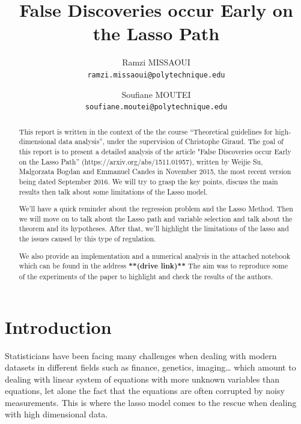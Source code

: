 \documentclass[10pt,onecolumn,letterpaper]{article}
\begin{document}
\title{False Discoveries occur Early on the Lasso Path}

\author{
   Ramzi MISSAOUI\\
{\tt\small ramzi.missaoui@polytechnique.edu}
\and
Soufiane MOUTEI\\
{\tt\small soufiane.moutei@polytechnique.edu}
}

\maketitle

\begin{abstract}
   This report is written in the context of the the course “Theoretical guidelines for high-dimensional data analysis”, under the supervision of Christophe Giraud.
The goal of this report is to present a detailed analysis of the article  "False Discoveries occur Early on the Lasso Path” (https://arxiv.org/abs/1511.01957),  written by Weijie Su, Malgorzata Bogdan and Emmanuel Candes in November 2015, the most recent version being dated September 2016. We will try to grasp the key points, discuss the main results then talk about some limitations of the Lasso model. 

We'll have a quick reminder about the regression problem and the Lasso Method. Then we will move on to talk about the Lasso path and variable selection and talk about the theorem and its hypotheses. After that, we’ll highlight the limitations of the lasso and the issues caused by this type of regulation.

We also provide an implementation and a numerical analysis in the attached notebook which can be found in the address \textbf{**(drive link)** }The aim was to reproduce some of the experiments of the paper to highlight and check the results of the authors.
\end{abstract}

\tableofcontents


\section{Introduction}

Statisticians have been facing many challenges when dealing with modern datasets in different fields such as finance, genetics, imaging… which amount to dealing with linear system of equations with more unknown variables than equations, let alone the fact that the equations are often corrupted by noisy measurements. This is where the lasso model comes to the rescue when dealing with high dimensional data.
\newline
\end{document}
